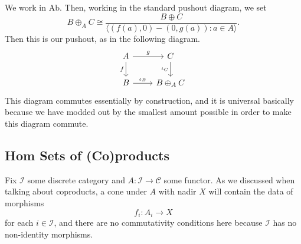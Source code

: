 \documentclass[../notes.tex]{subfiles}
\begin{document}
\begin{example}
	We work in $\mathrm{Ab}$. Then, working in the standard pushout diagram, we set
	\[B\oplus_AC\cong\frac{B\oplus C}{\langle(f(a),0)-(0,g(a)):a\in A\rangle}.\]
	Then this is our pushout, as in the following diagram.
	\[\begin{tikzcd}
		A & C \\
		B & {B\oplus_AC}
		\arrow["f"', from=1-1, to=2-1]
		\arrow["g", from=1-1, to=1-2]
		\arrow["{\iota_C}"', from=1-2, to=2-2]
		\arrow["{\iota_B}", from=2-1, to=2-2]
	\end{tikzcd}\]
	This diagram commutes essentially by construction, and it is universal basically because we have modded out by the smallest amount possible in order to make this diagram commute.
\end{example}

\subsection{\textrm{Hom} Sets of (Co)products}
Fix $\mathcal I$ some discrete category and $A:\mathcal I\to\mathcal C$ some functor. As we discussed when talking about coproducts, a cone under $A$ with nadir $X$ will contain the data of morphisms
\[f_i:A_i\to X\]
for each $i\in\mathcal I$, and there are no commutativity conditions here because $\mathcal I$ has no non-identity morphisms.
\end{document}
